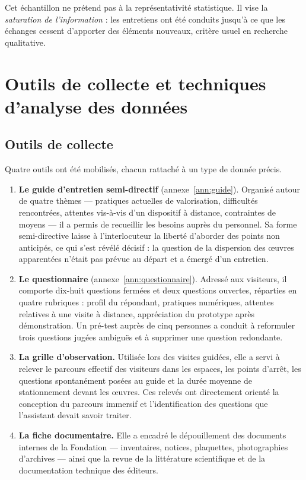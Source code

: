Cet échantillon ne prétend pas à la représentativité statistique. Il vise la
\emph{saturation de l'information} : les entretiens ont été conduits jusqu'à ce
que les échanges cessent d'apporter des éléments nouveaux, critère usuel en
recherche qualitative.

\section{Outils de collecte et techniques d'analyse des données}
\label{sec:outils}

\subsection{Outils de collecte}

Quatre outils ont été mobilisés, chacun rattaché à un type de donnée précis.

\begin{enumerate}
  \item \textbf{Le guide d'entretien semi-directif} (annexe~\ref{ann:guide}).
        Organisé autour de quatre thèmes — pratiques actuelles de valorisation,
        difficultés rencontrées, attentes vis-à-vis d'un dispositif à distance,
        contraintes de moyens — il a permis de recueillir les besoins auprès du
        personnel. Sa forme semi-directive laisse à l'interlocuteur la liberté
        d'aborder des points non anticipés, ce qui s'est révélé décisif : la
        question de la dispersion des œuvres apparentées n'était pas prévue au
        départ et a émergé d'un entretien.

  \item \textbf{Le questionnaire} (annexe~\ref{ann:questionnaire}). Adressé aux
        visiteurs, il comporte dix-huit questions fermées et deux questions
        ouvertes, réparties en quatre rubriques : profil du répondant, pratiques
        numériques, attentes relatives à une visite à distance, appréciation du
        prototype après démonstration. Un pré-test auprès de cinq personnes a
        conduit à reformuler trois questions jugées ambiguës et à supprimer une
        question redondante.

  \item \textbf{La grille d'observation.} Utilisée lors des visites guidées,
        elle a servi à relever le parcours effectif des visiteurs dans les
        espaces, les points d'arrêt, les questions spontanément posées au guide
        et la durée moyenne de stationnement devant les œuvres. Ces relevés ont
        directement orienté la conception du parcours immersif et
        l'identification des questions que l'assistant devait savoir traiter.

  \item \textbf{La fiche documentaire.} Elle a encadré le dépouillement des
        documents internes de la Fondation — inventaires, notices, plaquettes,
        photographies d'archives — ainsi que la revue de la littérature
        scientifique et de la documentation technique des éditeurs.
\end{enumerate}

